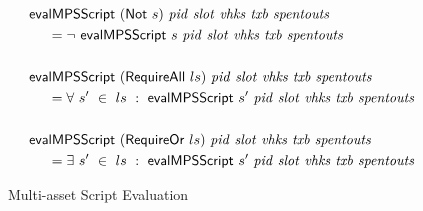 \begin{figure*}[htb]
\begin{align*}
    &\mathsf{evalMPSScript}~(\mathsf{Not}~s)~\mathit{pid}~\mathit{slot}~\mathit{vhks}
    ~\mathit{txb}~\mathit{spentouts}
   \\
    &~~~~ = \neg ~\mathsf{evalMPSScript}~s~\mathit{pid}~\mathit{slot}~\mathit{vhks}
    ~\mathit{txb}~\mathit{spentouts}\\~\\
    &\mathsf{evalMPSScript}~(\mathsf{RequireAll}~ls)~\mathit{pid}~\mathit{slot}~\mathit{vhks}
    ~\mathit{txb}~\mathit{spentouts}
   \\
    &~~~~ = \forall ~s'~ \in~ ls~:~\mathsf{evalMPSScript}~s'~\mathit{pid}~\mathit{slot}~\mathit{vhks}
    ~\mathit{txb}~\mathit{spentouts}\\~\\
    &\mathsf{evalMPSScript}~(\mathsf{RequireOr}~ls)~\mathit{pid}~\mathit{slot}~\mathit{vhks}
    ~\mathit{txb}~\mathit{spentouts}
   \\
    &~~~~ = \exists ~s'~ \in~ ls~:~\mathsf{evalMPSScript}~s'~\mathit{pid}~\mathit{slot}~\mathit{vhks}
    ~\mathit{txb}~\mathit{spentouts}\\
  \end{align*}
  \caption{Multi-asset Script Evaluation}
  \label{fig:defs:tx-mc-eval}
\end{figure*}

